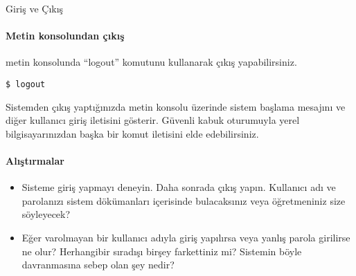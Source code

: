 \begin{section}{Giriş ve Çıkış}
\paragraph{Metin konsolundan çıkış}{metin konsolunda “logout” komutunu kullanarak çıkış yapabilirsiniz.}

\begin{verbatim}
$ logout
\end{verbatim}

Sistemden çıkış yaptığınızda metin konsolu üzerinde sistem başlama mesajını ve diğer kullanıcı giriş iletisini gösterir. Güvenli kabuk oturumuyla yerel bilgisayarınızdan başka bir komut iletisini elde edebilirsiniz. 

\paragraph{Alıştırmalar}{
\begin{itemize}
 \item Sisteme giriş yapmayı deneyin. Daha sonrada çıkış yapın. Kullanıcı adı ve parolanızı sistem dökümanları içerisinde bulacaksınız veya öğretmeniniz size söyleyecek?
 \item Eğer varolmayan bir kullanıcı adıyla giriş yapılırsa veya yanlış parola girilirse ne olur? Herhangibir sıradışı birşey farkettiniz mi? Sistemin böyle davranmasına sebep olan şey nedir?
\end{itemize}}
\end{section}

